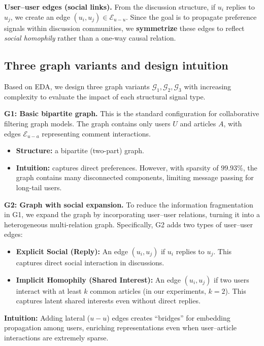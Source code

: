 \documentclass[11pt]{article}
\begin{document}
\textbf{User--user edges (social links).} From the discussion structure, if $u_i$ replies to $u_j$, we create an edge $(u_i,u_j)\in \mathcal{E}_{u-u}$. Since the goal is to propagate preference signals within discussion communities, we \textbf{symmetrize} these edges to reflect \textit{social homophily} rather than a one-way causal relation.

\subsection{Three graph variants and design intuition}
\label{sec:graph_configs}

Based on EDA, we design three graph variants $\mathcal{G}_1, \mathcal{G}_2, \mathcal{G}_3$ with increasing complexity to evaluate the impact of each structural signal type.

\textbf{G1: Basic bipartite graph.}
This is the standard configuration for collaborative filtering graph models. The graph contains only users $U$ and articles $A$, with edges $\mathcal{E}_{u-a}$ representing comment interactions.
\begin{itemize}
    \item \textbf{Structure:} a bipartite (two-part) graph.
    \item \textbf{Intuition:} captures direct preferences. However, with sparsity of $99.93\%$, the graph contains many disconnected components, limiting message passing for long-tail users.
\end{itemize}

\textbf{G2: Graph with social expansion.}
To reduce the information fragmentation in G1, we expand the graph by incorporating user--user relations, turning it into a heterogeneous multi-relation graph. Specifically, G2 adds two types of user--user edges:
\begin{itemize}
    \item \textbf{Explicit Social (Reply):} An edge $(u_i, u_j)$ if $u_i$ replies to $u_j$. This captures direct social interaction in discussions.
    \item \textbf{Implicit Homophily (Shared Interest):} An edge $(u_i, u_j)$ if two users interact with at least $k$ common articles (in our experiments, $k=2$). This captures latent shared interests even without direct replies.
\end{itemize}
\textbf{Intuition:} Adding lateral ($u-u$) edges creates ``bridges'' for embedding propagation among users, enriching representations even when user--article interactions are extremely sparse.
\end{document}

